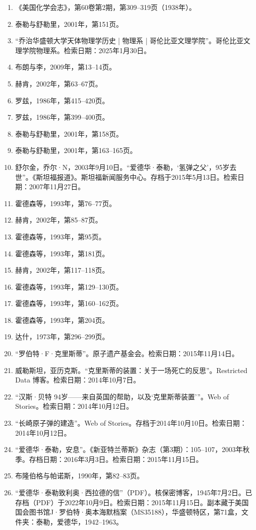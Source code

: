 \begin{enumerate}
\item 《美国化学会志》，第60卷第2期，第309–319页（1938年）。
\item 泰勒与舒勒里，2001年，第151页。
\item “乔治华盛顿大学天体物理学历史 | 物理系 | 哥伦比亚文理学院”。哥伦比亚文理学院物理系。检索日期：2025年1月30日。
\item 布朗与李，2009年，第13–14页。
\item 赫肯，2002年，第63–67页。
\item 罗兹，1986年，第415–420页。
\item 罗兹，1986年，第399–400页。
\item 泰勒与舒勒里，2001年，第158页。
\item 泰勒与舒勒里，2001年，第163–165页。
\item 舒尔金，乔尔·N，2003年9月10日。“爱德华·泰勒，‘氢弹之父’，95岁去世”。《斯坦福报道》。斯坦福新闻服务中心。存档于2015年5月13日。检索日期：2007年11月27日。
\item 霍德森等，1993年，第76–77页。
\item 赫肯，2002年，第85–87页。
\item 霍德森等，1993年，第95页。
\item 霍德森等，1993年，第181页。
\item 赫肯，2002年，第117–118页。
\item 霍德森等，1993年，第129–130页。
\item 霍德森等，1993年，第160–162页。
\item 霍德森等，1993年，第204页。
\item 达什，1973年，第296–299页。
\item “罗伯特·F·克里斯蒂”。原子遗产基金会。检索日期：2015年11月14日。
\item 威勒斯坦，亚历克斯。“克里斯蒂的装置：关于一场死亡的反思”。Restricted Data 博客。检索日期：2014年10月7日。
\item “汉斯·贝特 94岁——来自英国的帮助，以及‘克里斯蒂装置’”。Web of Stories。检索日期：2014年10月12日。
\item “长崎原子弹的建造”。Web of Stories。存档于2014年10月10日。检索日期：2014年10月12日。
\item “爱德华·泰勒，安息”。《新亚特兰蒂斯》杂志（第3期）：105–107，2003年秋季。存档日期：2016年3月3日。检索日期：2015年11月15日。
\item 布隆伯格与帕诺斯，1990年，第82–83页。
\item “爱德华·泰勒致利奥·西拉德的信”（PDF）。核保密博客，1945年7月2日。已存档（PDF）于2022年10月9日。检索日期：2015年11月15日。副本藏于美国国会图书馆J·罗伯特·奥本海默档案（MS35188），华盛顿特区，第71盒，文件夹：泰勒，爱德华，1942–1963。

\end{enumerate}
